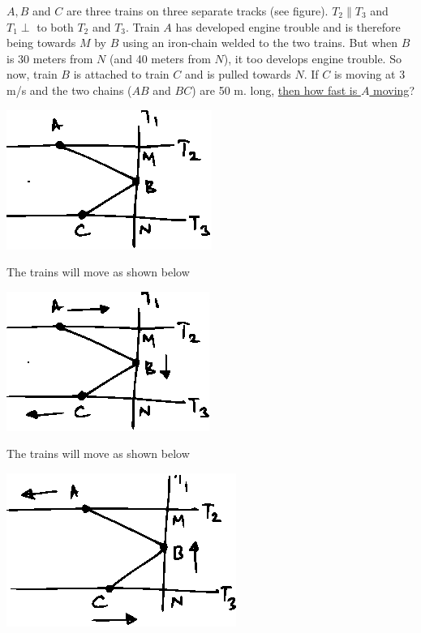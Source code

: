 \documentclass[14pt,fleqn]{extarticle}
\begin{document}
\begin{question}
\statement
	

    $A, B$ and $C$ are three trains on three separate
    tracks (see figure). $T_2\parallel T_3$ and  $T_1\perp$ to both
    $T_2$ and $T_3$. Train $A$ has developed engine trouble 
    and is therefore being towards $M$ by $B$ using
    an iron-chain welded to the two trains. But 
    when $B$ is 30 meters from $N$ (and 40 meters 
    from $N$), it too develops engine trouble. So
    now, train $B$ is attached to train $C$ and is pulled
    towards $N$. If $C$ is moving at 3 m/s and the two
    chains ($AB$ and $BC$) are 50 m. long, 
    \underline{then how fast is $A$ moving}?
    
    \begin{center}
\includegraphics[scale=1.8]{333-A.eps}
\end{center}
    
\begin{step}
	\begin{options}
	
	\correct 
	
	The trains will move as shown below 
	\begin{center}
\includegraphics[scale=1.5]{333-B.eps}
\end{center}

	\incorrect 
	
	The trains will move as shown below 
	\begin{center}
\includegraphics[scale=1.5]{333-C.eps}
\end{center}
	

\end{options}
\end{step}
\end{question}
\end{document}
